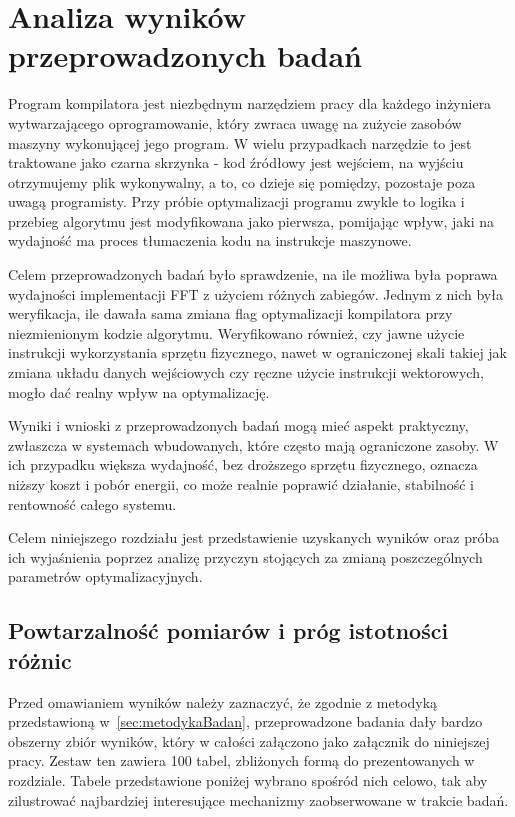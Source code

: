 \chapter{Analiza wyników przeprowadzonych badań}
Program kompilatora jest niezbędnym narzędziem pracy dla każdego inżyniera 
wytwarzającego oprogramowanie, który zwraca uwagę na zużycie zasobów maszyny wykonującej jego program.
W wielu przypadkach narzędzie to jest traktowane jako czarna
skrzynka - kod źródłowy jest wejściem, na wyjściu otrzymujemy plik wykonywalny, a to, co dzieje
się pomiędzy, pozostaje poza uwagą programisty. Przy próbie optymalizacji programu zwykle to logika i przebieg algorytmu 
jest modyfikowana jako pierwsza, pomijając wpływ, jaki na wydajność ma proces tłumaczenia kodu na instrukcje maszynowe.

Celem przeprowadzonych badań było sprawdzenie, na ile możliwa była poprawa wydajności implementacji FFT z użyciem różnych zabiegów.
Jednym z nich była weryfikacja, ile dawała sama zmiana flag optymalizacji kompilatora przy niezmienionym
kodzie algorytmu. Weryfikowano również, czy jawne użycie instrukcji wykorzystania sprzętu fizycznego, nawet w ograniczonej skali takiej jak 
zmiana układu danych wejściowych czy ręczne użycie instrukcji wektorowych, mogło dać realny wpływ na optymalizację. 

Wyniki i wnioski z przeprowadzonych badań mogą mieć aspekt praktyczny, zwłaszcza w systemach wbudowanych, które często mają ograniczone
zasoby. W ich przypadku większa wydajność, bez droższego sprzętu fizycznego, oznacza niższy koszt
i pobór energii, co może realnie poprawić działanie, stabilność i rentowność całego systemu.

Celem niniejszego rozdziału jest przedstawienie uzyskanych wyników oraz próba
ich wyjaśnienia poprzez analizę przyczyn stojących za zmianą poszczególnych
parametrów optymalizacyjnych.

\section{Powtarzalność pomiarów i próg istotności różnic}\label{sec:prog-istotnosci}
Przed omawianiem wyników należy zaznaczyć, że zgodnie z metodyką przedstawioną w~\cref{sec:metodykaBadan}, przeprowadzone badania dały bardzo
obszerny zbiór wyników, który w całości załączono jako załącznik do
niniejszej pracy. Zestaw ten zawiera 100 tabel, zbliżonych formą do
prezentowanych w rozdziale. Tabele przedstawione poniżej wybrano
spośród nich celowo, tak aby zilustrować najbardziej interesujące
mechanizmy zaobserwowane w trakcie badań.

